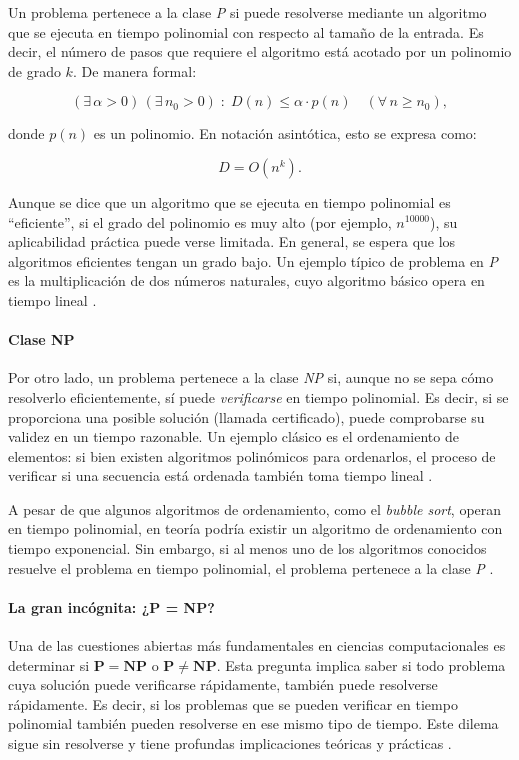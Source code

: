 \documentclass[12pt,titlepage,twoside,openright]{book}
\begin{document}
Un problema pertenece a la clase \emph{P} si puede resolverse mediante un algoritmo que se ejecuta en tiempo polinomial con respecto al tamaño de la entrada. Es decir, el número de pasos que requiere el algoritmo está acotado por un polinomio de grado \(k\). De manera formal:

\[
	(\exists\,\alpha > 0)\,(\exists\,n_0 > 0)\;:\; D(n) \leq \alpha \cdot p(n) \quad (\forall\,n \geq n_0),
\]

donde \(p(n)\) es un polinomio. En notación asintótica, esto se expresa como:

\[
	D = O(n^k).
\]

Aunque se dice que un algoritmo que se ejecuta en tiempo polinomial es “eficiente”, si el grado del polinomio es muy alto (por ejemplo, \(n^{10000}\)), su aplicabilidad práctica puede verse limitada. En general, se espera que los algoritmos eficientes tengan un grado bajo. Un ejemplo típico de problema en \emph{P} es la multiplicación de dos números naturales, cuyo algoritmo básico opera en tiempo lineal \citep{Flores2014}.

\paragraph{Clase NP}

Por otro lado, un problema pertenece a la clase \emph{NP} si, aunque no se sepa cómo resolverlo eficientemente, sí puede \emph{verificarse} en tiempo polinomial. Es decir, si se proporciona una posible solución (llamada certificado), puede comprobarse su validez en un tiempo razonable. Un ejemplo clásico es el ordenamiento de elementos: si bien existen algoritmos polinómicos para ordenarlos, el proceso de verificar si una secuencia está ordenada también toma tiempo lineal \citep{Flores2014}.

A pesar de que algunos algoritmos de ordenamiento, como el \emph{bubble sort}, operan en tiempo polinomial, en teoría podría existir un algoritmo de ordenamiento con tiempo exponencial. Sin embargo, si al menos uno de los algoritmos conocidos resuelve el problema en tiempo polinomial, el problema pertenece a la clase \emph{P} \citep{Flores2014}.

\paragraph{La gran incógnita: ¿P = NP?}

Una de las cuestiones abiertas más fundamentales en ciencias computacionales es determinar si \(\mathbf{P = NP}\) o \(\mathbf{P \neq NP}\). Esta pregunta implica saber si todo problema cuya solución puede verificarse rápidamente, también puede resolverse rápidamente. Es decir, si los problemas que se pueden verificar en tiempo polinomial también pueden resolverse en ese mismo tipo de tiempo. Este dilema sigue sin resolverse y tiene profundas implicaciones teóricas y prácticas \citep{maldonado2013problema}.
\end{document}
